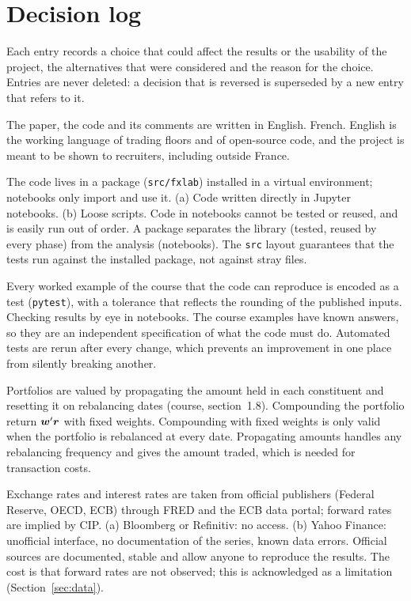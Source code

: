 \section{Decision log}\label{app:decisions}

Each entry records a choice that could affect the results or the usability of the project, the alternatives that were considered and the reason for the choice.
Entries are never deleted: a decision that is reversed is superseded by a new entry that refers to it.

{The paper, the code and its comments are written in English.}
{French.}
{English is the working language of trading floors and of open-source code, and the project is meant to be shown to recruiters, including outside France.}

{The code lives in a package (\texttt{src/fxlab}) installed in a virtual environment; notebooks only import and use it.}
{(a) Code written directly in Jupyter notebooks. (b) Loose scripts.}
{Code in notebooks cannot be tested or reused, and is easily run out of order. A package separates the library (tested, reused by every phase) from the analysis (notebooks). The \texttt{src} layout guarantees that the tests run against the installed package, not against stray files.}

{Every worked example of the course that the code can reproduce is encoded as a test (\texttt{pytest}), with a tolerance that reflects the rounding of the published inputs.}
{Checking results by eye in notebooks.}
{The course examples have known answers, so they are an independent specification of what the code must do. Automated tests are rerun after every change, which prevents an improvement in one place from silently breaking another.}

{Portfolios are valued by propagating the amount held in each constituent and resetting it on rebalancing dates (course, section~1.8).}
{Compounding the portfolio return $\boldsymbol{w}'\boldsymbol{r}$ with fixed weights.}
{Compounding with fixed weights is only valid when the portfolio is rebalanced at every date. Propagating amounts handles any rebalancing frequency and gives the amount traded, which is needed for transaction costs.}

{Exchange rates and interest rates are taken from official publishers (Federal Reserve, OECD, ECB) through FRED and the ECB data portal; forward rates are implied by CIP.}
{(a) Bloomberg or Refinitiv: no access. (b) Yahoo Finance: unofficial interface, no documentation of the series, known data errors.}
{Official sources are documented, stable and allow anyone to reproduce the results. The cost is that forward rates are not observed; this is acknowledged as a limitation (Section~\ref{sec:data}).}

